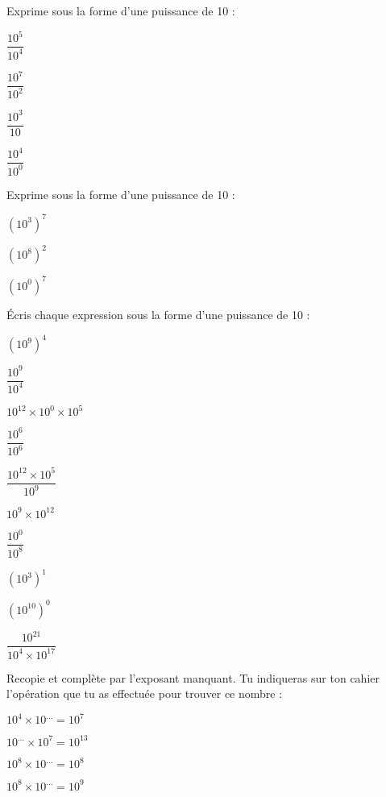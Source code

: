 \begin{exercice}
Exprime sous la forme d'une puissance de 10 :

\begin{colenumerate}{2} 
\item $\dfrac{10^5}{10^4}$
\item $\dfrac{10^7}{10^2}$
\item $\dfrac{10^3}{10}$
\item $\dfrac{10^4}{10^0}$
\end{colenumerate} 
\end{exercice}

\begin{exercice}
Exprime sous la forme d'une puissance de 10 :

\begin{colenumerate}{3} 
\item $\left(10^3\right)^7$
\item $\left(10^8\right)^2$
\item $\left(10^0\right)^7$
\end{colenumerate} 

\end{exercice}

\begin{exercice}
Écris chaque expression sous la forme d'une puissance de 10 :

\begin{colenumerate}{2} 
\item $\left(10^9\right)^4$
\item $\dfrac{10^9}{10^4}$
\item $10^{12} \times 10^0 \times 10^5$
\item $\dfrac{10^6}{10^6}$
\item $\dfrac{10^{12}\times 10^5}{10^9}$
\item $10^9 \times 10^{12}$
\item $\dfrac{10^0}{10^8}$
\item $\left(10^3\right)^1$
\item $\left(10^{10}\right)^0$
\item $\dfrac{10^{21}}{10^4 \times 10^{17}}$
\end{colenumerate}
\end{exercice}

\begin{exercice}[]
Recopie et complète par l'exposant manquant. Tu indiqueras sur ton cahier l'opération que tu as effectuée pour trouver ce nombre :

\begin{colenumerate}{2} 
\item $10^4 \times 10^{...} = 10^7$
\item $10^{...} \times 10^7 = 10^{13}$
\item $10^8 \times 10^{...} = 10^8$
\item $10^8 \times 10^{...} = 10^9$
\end{colenumerate} 

\end{exercice}


